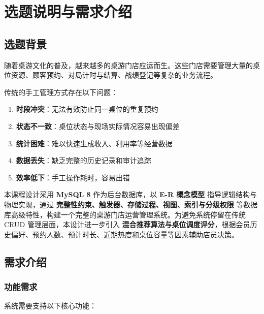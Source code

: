 \chapter{选题说明与需求介绍}

\section{选题背景}

随着桌游文化的普及，越来越多的桌游门店应运而生。这些门店需要管理大量的桌位资源、顾客预约、对局计时与结算、战绩登记等复杂的业务流程。

传统的手工管理方式存在以下问题：

\begin{enumerate}
  \item \textbf{时段冲突}：无法有效防止同一桌位的重复预约
  \item \textbf{状态不一致}：桌位状态与现场实际情况容易出现偏差
  \item \textbf{统计困难}：难以快速生成收入、利用率等经营数据
  \item \textbf{数据丢失}：缺乏完整的历史记录和审计追踪
  \item \textbf{效率低下}：手工操作耗时，容易出错
\end{enumerate}

本课程设计采用 \textbf{MySQL 8} 作为后台数据库，以 \textbf{E-R 概念模型} 指导逻辑结构与物理实现，通过 \textbf{完整性约束、触发器、存储过程、视图、索引与分级权限} 等数据库高级特性，构建一个完整的桌游门店运营管理系统。为避免系统停留在传统 CRUD 管理层面，本设计进一步引入 \textbf{混合推荐算法与桌位调度评分}，根据会员历史偏好、预约人数、预计时长、近期热度和桌位容量等因素辅助店员决策。

\section{需求介绍}

\subsection{功能需求}

系统需要支持以下核心功能：

